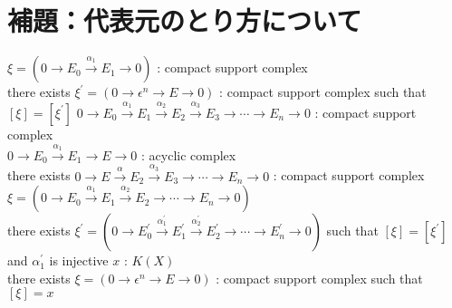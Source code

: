 \documentclass[dvipdfmx]{jsarticle}
\begin{document}
\section{補題：代表元のとり方について}
\begin{Theorem}
\itemprop
  \For \(\xi = (0 \to E_0 \overset{\alpha_1}{\to} E_1 \to 0)\) : compact support complex \\
  \Then there exists \(\xi^\prime = (0 \to \epsilon^n \to E \to 0)\) : compact support complex such that \([\xi] = [\xi^\prime]\)
\itemprop
  \For \(0 \to E_0 \overset{\alpha_1}{\to} E_1 \overset{\alpha_2}{\to} E_2 \overset{\alpha_3}{\to} E_3 \to \cdots \to E_n \to 0\) : compact support complex \\
  \For \(0 \to E_0 \overset{\alpha_1}{\to} E_1 \to E \to 0\) : acyclic complex \\
  \Then there exists \(0 \to E \overset{\alpha}{\to} E_2 \overset{\alpha_3}{\to} E_3 \to \cdots \to E_n \to 0\) : compact support complex
\itemprop
  \For \(\xi = (0 \to E_0 \overset{\alpha_1}{\to} E_1 \overset{\alpha_2}{\to} E_2 \to \cdots \to E_n \to 0)\) \\
  \Then there exists \(\xi^\prime = (0 \to E^\prime_0 \overset{\alpha^\prime_1}{\to} E^\prime_1 \overset{\alpha^\prime_2}{\to} E^\prime_2 \to \cdots \to E^\prime_n \to 0)\) such that \([\xi] = [\xi^\prime]\) and \(\alpha^\prime_1\) is injective
\itemprop
  \For \(x\) : \(K(X)\) \\
  \Then there exists \(\xi = (0 \to \epsilon^n \to E \to 0)\) : compact support complex such that \([\xi] = x\)
\end{Theorem}
\end{document}
